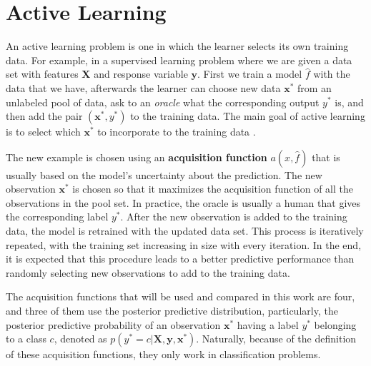 
\chapter{Active Learning}
\label{ch:active_learning}



An active learning problem is one in which the learner selects its own training data. For example, in a supervised learning problem where we are given a data set with features $\boldsymbol{X}$ and response variable $\boldsymbol{y}$. First we train a model $\hat{f}$ with the data that we have, afterwards the learner can choose new data $\boldsymbol{x}^*$ from an unlabeled pool of data, ask to an \textit{oracle} what the corresponding output $y^*$ is, and then add the pair $(\boldsymbol{x}^*, {y}^*)$ to the training data. The main goal of active learning is to select which $\boldsymbol{x}^*$ to incorporate to the training data \cite{cohn1996active}.

The new example is chosen using an \textbf{acquisition function} $a(x, \hat{f})$ that is usually based on the model's uncertainty about the prediction. The new observation $\boldsymbol{x}^*$ is chosen so that it maximizes the acquisition function of all the observations in the pool set. In practice, the oracle is usually a human that gives the corresponding label ${y}^*$. After the new observation is added to the training data, the model is retrained with the updated data set. This process is iteratively repeated, with the training set increasing in size with every iteration. In the end, it is expected that this procedure leads to a better predictive performance than randomly selecting new observations to add to the training data.

The acquisition functions that will be used and compared in this work are four, and three of them use the posterior predictive distribution, particularly, the posterior predictive probability of an observation $\boldsymbol{x}^*$ having a label $y^*$ belonging to a class $c$, denoted as  $p(y^* = c | \boldsymbol{X}, \boldsymbol{y}, \boldsymbol{x}^*)$. Naturally, because of the definition of these acquisition functions, they only work in classification problems.

